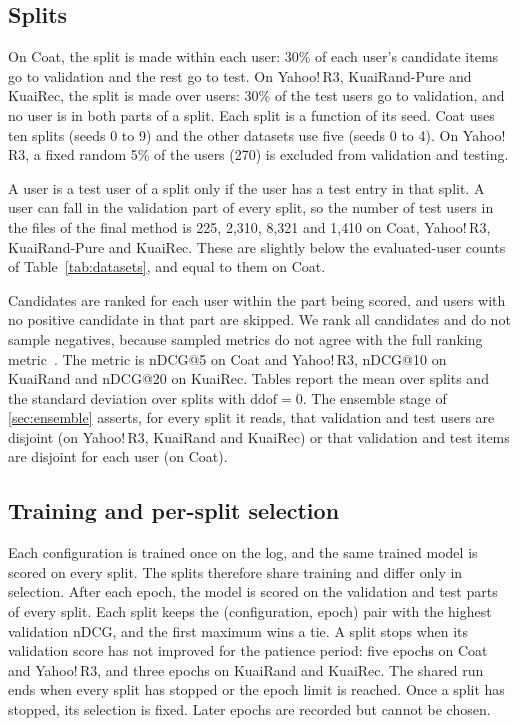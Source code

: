 \subsection{Splits}\label{sec:splits}

On Coat, the split is made within each user: 30\% of each user's candidate items go to validation and the
rest go to test. On Yahoo!\,R3, KuaiRand-Pure and KuaiRec, the split is made over users: 30\% of the test
users go to validation, and no user is in both parts of a split. Each split is a function of its seed.
Coat uses ten splits (seeds 0 to 9) and the other datasets use five (seeds 0 to 4). On Yahoo!\,R3, a
fixed random 5\% of the users (270) is excluded from validation and testing.

A user is a test user of a split only if the user has a test entry in that split. A user can fall in the
validation part of every split, so the number of test users in the files of the final method is 225,
2{,}310, 8{,}321 and 1{,}410 on Coat, Yahoo!\,R3, KuaiRand-Pure and KuaiRec. These are slightly below the
evaluated-user counts of Table~\ref{tab:datasets}, and equal to them on Coat.

Candidates are ranked for each user within the part being scored, and users with no positive candidate in
that part are skipped. We rank all candidates and do not sample negatives, because sampled metrics do not
agree with the full ranking metric~\citep{krichene2020sampled}. The metric is nDCG@5 on Coat and
Yahoo!\,R3, nDCG@10 on KuaiRand and nDCG@20 on KuaiRec. Tables report the mean over splits and the standard
deviation over splits with $\mathrm{ddof}=0$. The ensemble stage of \ref{sec:ensemble} asserts, for
every split it reads, that validation and test users are disjoint (on Yahoo!\,R3, KuaiRand and KuaiRec) or
that validation and test items are disjoint for each user (on Coat).

\subsection{Training and per-split selection}\label{sec:selection}

Each configuration is trained once on the log, and the same trained model is scored on every split. The
splits therefore share training and differ only in selection. After each epoch, the model is scored on the
validation and test parts of every split. Each split keeps the (configuration, epoch) pair with the highest
validation nDCG, and the first maximum wins a tie. A split stops when its validation score has not improved
for the patience period: five epochs on Coat and Yahoo!\,R3, and three epochs on KuaiRand and KuaiRec. The
shared run ends when every split has stopped or the epoch limit is reached. Once a split has stopped, its
selection is fixed. Later epochs are recorded but cannot be chosen.

